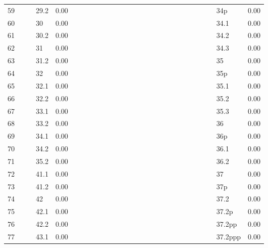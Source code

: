 \begin{table}[ht]
\begin{tabular}{rlrlrlrlrlrlrlrlrlrlrlrlrlr}
  59 &  &  & 29.2 & 0.00 &  &  &  &  &  &  &  &  &  &  &  &  &  &  &  &  &  &  &  &  & 34p & 0.00 \\ 
  60 &  &  & 30 & 0.00 &  &  &  &  &  &  &  &  &  &  &  &  &  &  &  &  &  &  &  &  & 34.1 & 0.00 \\ 
  61 &  &  & 30.2 & 0.00 &  &  &  &  &  &  &  &  &  &  &  &  &  &  &  &  &  &  &  &  & 34.2 & 0.00 \\ 
  62 &  &  & 31 & 0.00 &  &  &  &  &  &  &  &  &  &  &  &  &  &  &  &  &  &  &  &  & 34.3 & 0.00 \\ 
  63 &  &  & 31.2 & 0.00 &  &  &  &  &  &  &  &  &  &  &  &  &  &  &  &  &  &  &  &  & 35 & 0.00 \\ 
  64 &  &  & 32 & 0.00 &  &  &  &  &  &  &  &  &  &  &  &  &  &  &  &  &  &  &  &  & 35p & 0.00 \\ 
  65 &  &  & 32.1 & 0.00 &  &  &  &  &  &  &  &  &  &  &  &  &  &  &  &  &  &  &  &  & 35.1 & 0.00 \\ 
  66 &  &  & 32.2 & 0.00 &  &  &  &  &  &  &  &  &  &  &  &  &  &  &  &  &  &  &  &  & 35.2 & 0.00 \\ 
  67 &  &  & 33.1 & 0.00 &  &  &  &  &  &  &  &  &  &  &  &  &  &  &  &  &  &  &  &  & 35.3 & 0.00 \\ 
  68 &  &  & 33.2 & 0.00 &  &  &  &  &  &  &  &  &  &  &  &  &  &  &  &  &  &  &  &  & 36 & 0.00 \\ 
  69 &  &  & 34.1 & 0.00 &  &  &  &  &  &  &  &  &  &  &  &  &  &  &  &  &  &  &  &  & 36p & 0.00 \\ 
  70 &  &  & 34.2 & 0.00 &  &  &  &  &  &  &  &  &  &  &  &  &  &  &  &  &  &  &  &  & 36.1 & 0.00 \\ 
  71 &  &  & 35.2 & 0.00 &  &  &  &  &  &  &  &  &  &  &  &  &  &  &  &  &  &  &  &  & 36.2 & 0.00 \\ 
  72 &  &  & 41.1 & 0.00 &  &  &  &  &  &  &  &  &  &  &  &  &  &  &  &  &  &  &  &  & 37 & 0.00 \\ 
  73 &  &  & 41.2 & 0.00 &  &  &  &  &  &  &  &  &  &  &  &  &  &  &  &  &  &  &  &  & 37p & 0.00 \\ 
  74 &  &  & 42 & 0.00 &  &  &  &  &  &  &  &  &  &  &  &  &  &  &  &  &  &  &  &  & 37.2 & 0.00 \\ 
  75 &  &  & 42.1 & 0.00 &  &  &  &  &  &  &  &  &  &  &  &  &  &  &  &  &  &  &  &  & 37.2p & 0.00 \\ 
  76 &  &  & 42.2 & 0.00 &  &  &  &  &  &  &  &  &  &  &  &  &  &  &  &  &  &  &  &  & 37.2pp & 0.00 \\ 
  77 &  &  & 43.1 & 0.00 &  &  &  &  &  &  &  &  &  &  &  &  &  &  &  &  &  &  &  &  & 37.2ppp & 0.00 \\ 

\end{tabular}
\end{table}
